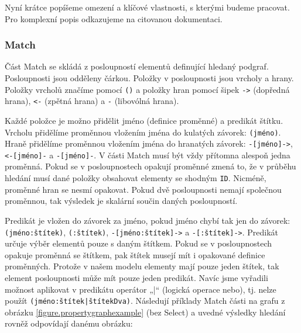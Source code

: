 Nyní krátce popíšeme omezení a klíčové vlastnosti, s kterými budeme pracovat.
Pro komplexní popis odkazujeme na citovanou dokumentaci.

\subsubsection{Match}

Část Match se skládá z posloupností elementů definující hledaný podgraf.
Posloupnosti jsou odděleny čárkou.
Položky v posloupnosti jsou vrcholy a hrany.
Položky vrcholů značíme pomocí \texttt{()} a položky hran pomocí šipek \texttt{->} (dopředná hrana), \texttt{<-} (zpětná hrana) a \texttt{-} (libovólná hrana).

Každé položce je možno přidělit jméno (definice proměnné) a predikát štítku.
Vrcholu přidělíme proměnnou vložením jména do kulatých závorek: \texttt{(jméno)}.
Hraně přidělíme proměnnou vložením jména do hranatých závorek: \texttt{-[jméno]->}, \texttt{<-[jméno]-} a \texttt{-[jméno]-}.
V části Match musí být vždy přítomna alespoň jedna proměnná.
Pokud se v posloupnostech opakují proměnné zmená to, že v průběhu hledání musí dané položky obsahovat elementy se shodným \texttt{ID}.
Nicméně, proměnné hran se nesmí opakovat.
Pokud dvě posloupnosti nemají společnou proměnnou, tak výsledek je skalární součin daných posloupností. 

Predikát je vložen do závorek za jméno, pokud jméno chybí tak jen do závorek: \texttt{(jméno:štítek)}, \texttt{(:štítek)}, \texttt{-[jméno:štítek]->} a \texttt{-[:štítek]->}.
Predikát určuje výběr elementů pouze s daným štítkem.
Pokud se v posloupnostech opakuje proměnná se štítkem, pak štítek musejí mít i opakované definice proměnných.
Protože v našem modelu elementy mají pouze jeden štítek, tak element posloupnosti může mít pouze jeden predikát.
Navíc jsme vyřadili možnost aplikovat v predikátu operátor „|“ (logická operace nebo), tj. nelze použít \texttt{(jméno:štítek|štítekDva)}.
Následují příklady Match části na grafu z obrázku \ref{figure.propertygraphexample} (bez Select) a uvedné výsledky hledání rovněž odpovídají danému obrázku:

